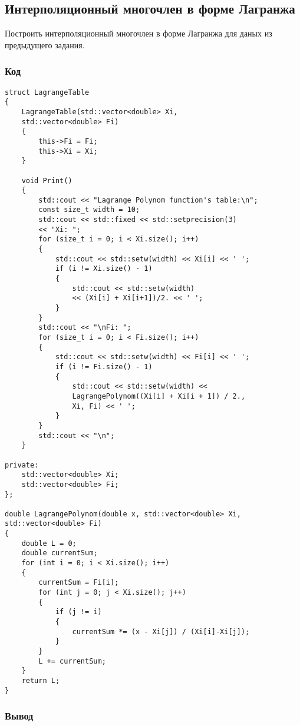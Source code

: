 \documentclass[bachelor, och, pract]{SCWorks}
\begin{document}
\subsection{Интерполяционный многочлен в форме Лагранжа}

    Построить интерполяционный многочлен в форме Лагранжа для даных из предыдущего задания.

\subsubsection{Код}

\begin{lstlisting}
struct LagrangeTable
{
    LagrangeTable(std::vector<double> Xi, 
    std::vector<double> Fi)
    {
        this->Fi = Fi;
        this->Xi = Xi;
    }

    void Print()
    {
        std::cout << "Lagrange Polynom function's table:\n";
        const size_t width = 10;
        std::cout << std::fixed << std::setprecision(3) 
        << "Xi: ";
        for (size_t i = 0; i < Xi.size(); i++)
        {
            std::cout << std::setw(width) << Xi[i] << ' ';
            if (i != Xi.size() - 1)
            {
                std::cout << std::setw(width) 
                << (Xi[i] + Xi[i+1])/2. << ' ';
            }
        }
        std::cout << "\nFi: ";
        for (size_t i = 0; i < Fi.size(); i++)
        {
            std::cout << std::setw(width) << Fi[i] << ' ';
            if (i != Fi.size() - 1)
            {
                std::cout << std::setw(width) << 
                LagrangePolynom((Xi[i] + Xi[i + 1]) / 2., 
                Xi, Fi) << ' ';
            }
        }
        std::cout << "\n";
    }

private:
    std::vector<double> Xi;
    std::vector<double> Fi;
};

double LagrangePolynom(double x, std::vector<double> Xi, 
std::vector<double> Fi)
{
    double L = 0;
    double currentSum;
    for (int i = 0; i < Xi.size(); i++)
    {
        currentSum = Fi[i];
        for (int j = 0; j < Xi.size(); j++)
        {
            if (j != i)
            {
                currentSum *= (x - Xi[j]) / (Xi[i]-Xi[j]);
            }
        }
        L += currentSum;
    }
    return L;
}
\end{lstlisting}


\subsubsection{Вывод}
\end{document}

